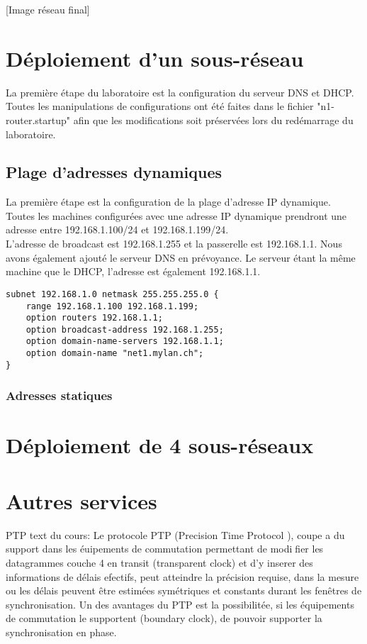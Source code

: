 \documentclass{article}
\begin{document}
[Image réseau final]


\section{Déploiement d'un sous-réseau}

La première étape du laboratoire est la configuration du serveur DNS et DHCP. Toutes les manipulations de configurations ont été faites dans le fichier "n1-router.startup" afin que les modifications soit préservées lors du redémarrage du laboratoire.


\subsection{Plage d'adresses dynamiques}

La première étape est la configuration de la plage d'adresse IP dynamique. Toutes les machines configurées avec une adresse IP dynamique prendront une adresse entre 192.168.1.100/24 et 192.168.1.199/24.\\

L'adresse de broadcast est 192.168.1.255 et la passerelle est 192.168.1.1. Nous avons également ajouté le serveur DNS en prévoyance. Le serveur étant la même machine que le DHCP, l'adresse est également 192.168.1.1.\\

\begin{lstlisting}
subnet 192.168.1.0 netmask 255.255.255.0 {
	range 192.168.1.100 192.168.1.199;
	option routers 192.168.1.1;
	option broadcast-address 192.168.1.255;
	option domain-name-servers 192.168.1.1;
	option domain-name "net1.mylan.ch";
}
\end{lstlisting}


\subsubsection{Adresses statiques}


\section{Déploiement de 4 sous-réseaux}

\section{Autres services}

PTP text du cours:
Le protocole PTP (Precision Time Protocol ), coupe a du support dans les éuipements de commutation permettant de modifier les datagrammes couche 4 en transit (transparent clock) et d'y inserer des informations de délais efectifs, peut atteindre la précision requise, dans la mesure ou les délais peuvent être estimées symétriques et constants durant les fenêtres de synchronisation. Un des avantages du
PTP est la possibilitée, si les équipements de commutation le supportent (boundary clock), de pouvoir supporter la synchronisation en phase.
\end{document}
